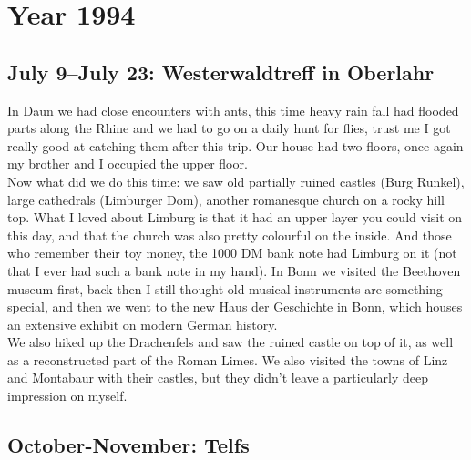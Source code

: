 \chapter{Year 1994}
\label{1994}

\section{July 9--July 23: Westerwaldtreff in Oberlahr}
\label{1994:Westerwald}

In Daun we had close encounters with ants, this time heavy rain fall had flooded parts along the Rhine and we had to go on a daily hunt for flies, trust me I got really good at catching them after this trip. Our house had two floors, once again my brother and I occupied the upper floor.\\

Now what did we do this time: we saw old partially ruined castles (Burg Runkel), large cathedrals (Limburger Dom), another romanesque church on a rocky hill top. What I loved about Limburg is that it had an upper layer you could visit on this day, and that the church was also pretty colourful on the inside. And those who remember their toy money, the 1000 DM bank note had Limburg on it (not that I ever had such a bank note in my hand). In Bonn we visited the Beethoven museum first, back then I still thought old musical instruments are something special, and then we went to the new Haus der Geschichte in Bonn, which houses an extensive exhibit on modern German history.\\
We also hiked up the Drachenfels and saw the ruined castle on top of it, as well as a reconstructed part of the Roman Limes. We also visited the towns of Linz and Montabaur with their castles, but they didn't leave a particularly deep impression on myself.



\section{October-November: Telfs}
\label{1994:Telfs}

